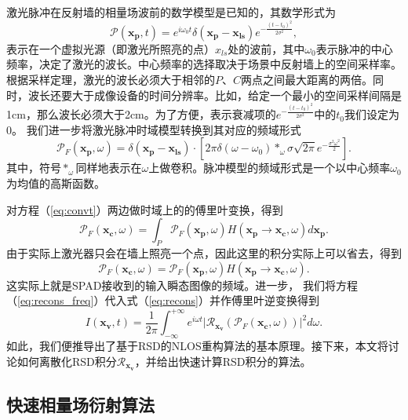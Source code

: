 \documentclass[master]{shtthesis}             %
\begin{document}
激光脉冲在反射墙的相量场波前的数学模型是已知的，其数学形式为
\begin{equation}
 \mathcal{P}(\mathbf{x_p},t) = e^{i\omega_0 t}\delta(\mathbf{x_p}-\mathbf{x_{ls}})e^{-\frac{(t-t_0)^2}{2\sigma^2}},
\end{equation}
表示在一个虚拟光源（即激光所照亮的点）$x_{ls}$处的波前，其中$\omega_0$表示脉冲的中心频率，决定了激光的波长。中心频率的选择取决于场景中反射墙上的空间采样率。根据采样定理，激光的波长必须大于相邻的$P$、$C$两点之间最大距离的两倍。同时，波长还要大于成像设备的时间分辨率\citep{Liu2019}。比如，给定一个最小的空间采样间隔是1cm，那么波长必须大于2cm。为了方便，表示衰减项的$e^{-\frac{(t-t_0)^2}{2\sigma^2}}$中的$t_0$我们设定为0。
我们进一步将激光脉冲时域模型转换到其对应的频域形式
\begin{equation}
 \mathcal{P}_F(\mathbf{x_p},\omega) = \delta(\mathbf{x_p}-\mathbf{x_{ls}})\cdot \left[ 2\pi\delta(\omega-\omega_0)*_\omega\sigma\sqrt{2\pi}e^{-\frac{\sigma^2\omega^2}{2}} \right].
\end{equation}
其中，符号$*_\omega$同样地表示在$\omega$上做卷积。脉冲模型的频域形式是一个以中心频率$\omega_0$为均值的高斯函数。

对方程（\ref{eq:convt}）两边做时域上的的傅里叶变换，得到
\begin{equation}
  \mathcal{P}_F(\mathbf{x_c},\omega) = \int_P \mathcal{P}_F(\mathbf{x_p},\omega) H(\mathbf{x_p}\rightarrow \mathbf{x_c},\omega) d\mathbf{x_p}.
\end{equation}
由于实际上激光器只会在墙上照亮一个点，因此这里的积分实际上可以省去，得到
\begin{equation}
  \mathcal{P}_F(\mathbf{x_c},\omega) = \mathcal{P}_F(\mathbf{x_p},\omega) H(\mathbf{x_p}\rightarrow \mathbf{x_c},\omega).
\end{equation}
这实际上就是SPAD接收到的输入瞬态图像的频域。进一步，
我们将方程（\ref{eq:recons_freq}）代入式（\ref{eq:recons}）并作傅里叶逆变换得到
\begin{equation}
  I(\mathbf{x_v},t)=\frac{1}{2\pi}\int_{-\infty}^{+\infty}e^{i\omega t}\Big| \mathcal{R}_{\mathbf{x_v}} \left( \mathcal{P}_F(\mathbf{x_c},\omega) \right) \Big|^2 d\omega.
\end{equation}
如此，我们便推导出了基于RSD的NLOS重构算法的基本原理。接下来，本文将讨论如何离散化RSD积分$\mathcal{R}_{\mathbf{x_v}}$，并给出快速计算RSD积分的算法。

\subsection{快速相量场衍射算法}
\end{document}

